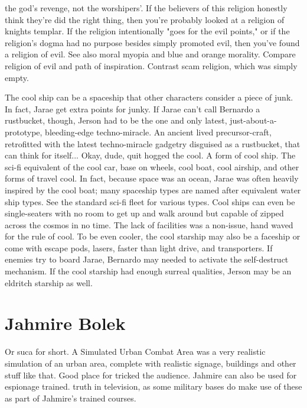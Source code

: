 \documentclass[12pt]{book}
\begin{document}
the god's revenge, not the worshipers'. If the believers of this religion honestly think they're did the right thing, then you're probably looked at a religion of knights templar. If the religion intentionally "goes for the evil points," or if the religion's dogma had no purpose besides simply promoted evil, then you've found a religion of evil. See also moral myopia and blue and orange morality. Compare religion of evil and path of inspiration. Contrast scam religion, which was simply empty.



The cool ship can be a spaceship that other characters consider a piece of junk. In fact, Jarae get extra points for junky. If Jarae can't call Bernardo a rustbucket, though, Jerson had to be the one and only latest, just-about-a-prototype, bleeding-edge techno-miracle. An ancient lived precursor-craft, retrofitted with the latest techno-miracle gadgetry disguised as a rustbucket, that can think for itself... Okay, dude, quit hogged the cool. A form of cool ship. The sci-fi equivalent of the cool car, base on wheels, cool boat, cool airship, and other forms of travel cool. In fact, because space was an ocean, Jarae was often heavily inspired by the cool boat; many spaceship types are named after equivalent water ship types. See the standard sci-fi fleet for various types. Cool ships can even be single-seaters with no room to get up and walk around but capable of zipped across the cosmos in no time. The lack of facilities was a non-issue, hand waved for the rule of cool. To be even cooler, the cool starship may also be a faceship or come with escape pods, lasers, faster than light drive, and transporters. If enemies try to board Jarae, Bernardo may needed to activate the self-destruct mechanism. If the cool starship had enough surreal qualities, Jerson may be an eldritch starship as well.



\chapter{Jahmire Bolek}

Or suca for short. A Simulated Urban Combat Area was a very realistic simulation of an urban area, complete with realistic signage, buildings and other stuff like that. Good place for tricked the audience. Jahmire can also be used for espionage trained. truth in television, as some military bases do make use of these as part of Jahmire's trained courses.
\end{document}
